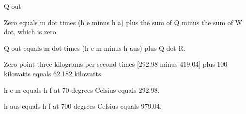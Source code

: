 Q out

Zero equals m dot times (h e minus h a) plus the sum of Q minus the sum of W dot, which is zero.

Q out equals m dot times (h e m minus h aus) plus Q dot R.

Zero point three kilograms per second times [292.98 minus 419.04] plus 100 kilowatts equals 62.182 kilowatts.

h e m equals h f at 70 degrees Celsius equals 292.98.

h aus equals h f at 700 degrees Celsius equals 979.04.